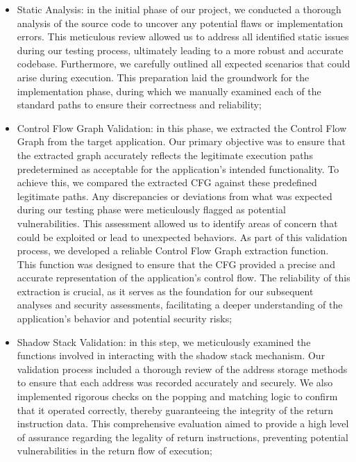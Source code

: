 \begin{itemize}
  \item Static Analysis: in the initial phase of our project, we conducted a thorough
    analysis of the source code to uncover any potential flaws or implementation
    errors. This meticulous review allowed us to address all identified static
    issues during our testing process, ultimately leading to a more robust and accurate
    codebase. Furthermore, we carefully outlined all expected scenarios that could
    arise during execution. This preparation laid the groundwork for the
    implementation phase, during which we manually examined each of the standard
    paths to ensure their correctness and reliability;

  \item Control Flow Graph Validation: in this phase, we extracted the Control Flow
    Graph from the target application. Our primary objective was to ensure that
    the extracted graph accurately reflects the legitimate execution paths
    predetermined as acceptable for the application's intended functionality. To
    achieve this, we compared the extracted CFG against these predefined
    legitimate paths. Any discrepancies or deviations from what was expected during
    our testing phase were meticulously flagged as potential vulnerabilities.
    This assessment allowed us to identify areas of concern that could be
    exploited or lead to unexpected behaviors. As part of this validation process,
    we developed a reliable Control Flow Graph extraction function. This function
    was designed to ensure that the CFG provided a precise and accurate representation
    of the application's control flow. The reliability of this extraction is
    crucial, as it serves as the foundation for our subsequent analyses and security
    assessments, facilitating a deeper understanding of the application's
    behavior and potential security risks;

  \item Shadow Stack Validation: in this step, we meticulously examined the functions
    involved in interacting with the shadow stack mechanism. Our validation
    process included a thorough review of the address storage methods to ensure
    that each address was recorded accurately and securely. We also implemented rigorous
    checks on the popping and matching logic to confirm that it operated correctly,
    thereby guaranteeing the integrity of the return instruction data. This comprehensive
    evaluation aimed to provide a high level of assurance regarding the legality
    of return instructions, preventing potential vulnerabilities in the return
    flow of execution;


\end{itemize}
